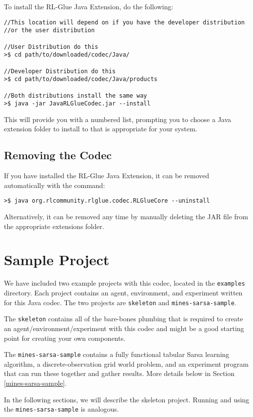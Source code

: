 \documentclass[11pt]{article}
\begin{document}
To install the RL-Glue Java Extension, do the following:
\begin{verbatim}
//This location will depend on if you have the developer distribution
//or the user distribution

//User Distribution do this
>$ cd path/to/downloaded/codec/Java/

//Developer Distribution do this
>$ cd path/to/downloaded/codec/Java/products

//Both distributions install the same way
>$ java -jar JavaRLGlueCodec.jar --install
\end{verbatim}

This will provide you with a numbered list, prompting you to choose a Java extension folder to install to that is appropriate for your system.

\subsection{Removing the Codec}
If you have installed the RL-Glue Java Extension, it can be removed automatically with the command:
\begin{verbatim}
>$ java org.rlcommunity.rlglue.codec.RLGlueCore --uninstall
\end{verbatim}

Alternatively, it can be removed any time by manually deleting the JAR file from the appropriate extensions folder.

\section{Sample Project}
We have included two example projects with this codec, located in the \texttt{examples} directory.  Each project contains an agent, environment, and experiment written for this Java codec.  The two projects are \texttt{skeleton} and \texttt{mines-sarsa-sample}.

The \texttt{skeleton} contains all of the bare-bones plumbing that is required to create an agent/environment/experiment with this codec and might be a good starting point for creating your own components.

The \texttt{mines-sarsa-sample} contains a fully functional tabular Sarsa learning algorithm, a discrete-observation grid world problem, and an experiment program that can run these together and gather results.  More details below in Section \ref{mines-sarsa-sample}.

In the following sections, we will describe the skeleton project.  Running and using the \texttt{mines-sarsa-sample} is analogous.
\end{document}
